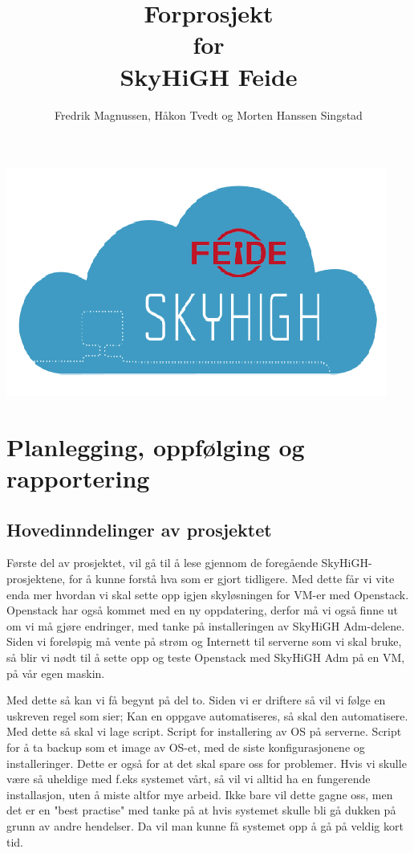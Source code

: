 \documentclass[12pt,a4paper]{article}
\begin{document}
\title{Forprosjekt \\ for \\ SkyHiGH Feide}
\author{Fredrik Magnussen, Håkon Tvedt og Morten Hanssen Singstad}
\maketitle
\begin{center}
\includegraphics[scale=1]{logo.png}
\end{center}

\newpage
\tableofcontents

\newpage
\section{Planlegging, oppfølging og rapportering}
\subsection{Hovedinndelinger av prosjektet}
Første del av prosjektet, vil gå til å lese gjennom de foregående SkyHiGH-prosjektene, for å kunne forstå hva som er 
gjort tidligere. Med dette får vi vite enda mer hvordan vi skal sette opp igjen skyløsningen for VM-er med Openstack.
Openstack har også kommet med en ny oppdatering, derfor må vi også finne ut om vi må gjøre endringer, med tanke på installeringen 
av SkyHiGH Adm-delene. Siden vi foreløpig må vente på strøm og Internett til serverne som vi skal bruke, så blir vi nødt til å 
sette opp og teste Openstack med SkyHiGH Adm på en VM, på vår egen maskin. \newline \newline

Med dette så kan vi få begynt på del to. Siden vi er driftere så vil vi følge en uskreven regel som sier; Kan en oppgave automatiseres, så skal den automatisere.
Med dette så skal vi lage script. Script for installering av OS på serverne. Script for å ta backup som et image av OS-et, med de siste konfigurasjonene og installeringer.
Dette er også for at det skal spare oss for problemer. Hvis vi skulle være så uheldige med f.eks systemet vårt, så vil vi alltid ha en fungerende installasjon, uten å miste
altfor mye arbeid. Ikke bare vil dette gagne oss, men det er en "best practise" med tanke på at hvis systemet skulle bli gå dukken på grunn av andre hendelser. Da vil 
man kunne få systemet opp å gå på veldig kort tid. \newline \newline
\end{document}
